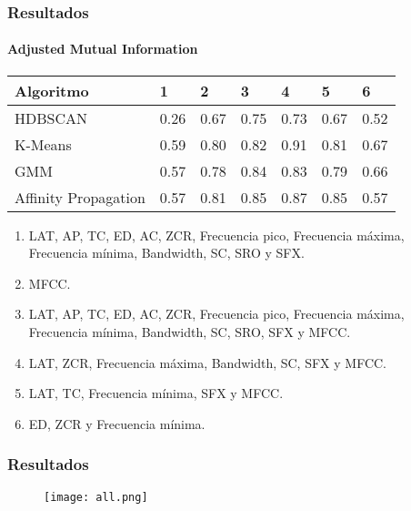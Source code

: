\begin{frame}
    \frametitle{Resultados}
    \framesubtitle{Adjusted Mutual Information}

    \begin{table}[H]
        \centering
        \begin{tabular}{lllllll}
            \hline
            Algoritmo & 1 & 2 & 3 & 4 & 5 & 6  \\ \hline
            HDBSCAN & 0.26 & 0.67 & 0.75 & 0.73 & 0.67 & 0.52 \\
            K-Means & 0.59 & 0.80 & 0.82 & \cellcolor[HTML]{FFFC9E}0.91 & 0.81 & 0.67 \\
            GMM & 0.57 & 0.78 & 0.84 & 0.83 & 0.79 & 0.66 \\
            Affinity Propagation & 0.57 & 0.81 & 0.85 & 0.87 & 0.85 & 0.57
        \end{tabular}
    \end{table}

    {\tiny
    \begin{enumerate}
        \item LAT, AP, TC, ED, AC, ZCR, Frecuencia pico, Frecuencia máxima, Frecuencia mínima, Bandwidth, SC, SRO y SFX\@. %
        \item MFCC\@. %
        \item LAT, AP, TC, ED, AC, ZCR, Frecuencia pico, Frecuencia máxima, Frecuencia mínima, Bandwidth, SC, SRO, SFX y MFCC\@.
        \item LAT, ZCR, Frecuencia máxima, Bandwidth, SC, SFX y MFCC\@. %
        \item LAT, TC, Frecuencia mínima, SFX y MFCC\@. %
        \item ED, ZCR y Frecuencia mínima.
    \end{enumerate}
    }

\end{frame}

\begin{frame}
    \frametitle{Resultados}

    \begin{figure}[!h]
        \centering
        \texttt{[image: all.png]}
    \end{figure}

\end{frame}

